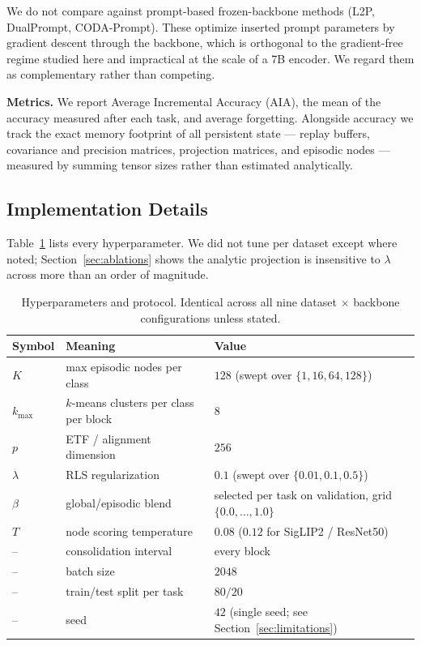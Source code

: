 We do not compare against prompt-based frozen-backbone methods (L2P, DualPrompt, CODA-Prompt). These optimize inserted prompt parameters by gradient descent through the backbone, which is orthogonal to the gradient-free regime studied here and impractical at the scale of a 7B encoder. We regard them as complementary rather than competing.

\textbf{Metrics.} We report Average Incremental Accuracy (AIA), the mean of the accuracy measured after each task, and average forgetting. Alongside accuracy we track the exact memory footprint of all persistent state --- replay buffers, covariance and precision matrices, projection matrices, and episodic nodes --- measured by summing tensor sizes rather than estimated analytically.

\subsection{Implementation Details}
\label{sec:repro}

Table~\ref{tab:hparams} lists every hyperparameter. We did not tune per dataset except where noted; Section~\ref{sec:ablations} shows the analytic projection is insensitive to $\lambda$ across more than an order of magnitude.

\begin{table}[htbp]
\centering
\caption{Hyperparameters and protocol. Identical across all nine dataset $\times$ backbone configurations unless stated.}
\label{tab:hparams}
\begin{tabular}{lll}
\toprule
\textbf{Symbol} & \textbf{Meaning} & \textbf{Value} \\
\midrule
$K$        & max episodic nodes per class      & $128$ (swept over $\{1,16,64,128\}$) \\
$k_{\max}$ & $k$-means clusters per class per block & $8$ \\
$p$        & ETF / alignment dimension          & $256$ \\
$\lambda$  & RLS regularization                 & $0.1$ (swept over $\{0.01,0.1,0.5\}$) \\
$\beta$    & global/episodic blend              & selected per task on validation, grid $\{0.0,\dots,1.0\}$ \\
$T$        & node scoring temperature           & $0.08$ ($0.12$ for SigLIP2 / ResNet50) \\
--         & consolidation interval             & every block \\
--         & batch size                         & $2048$ \\
--         & train/test split per task          & $80/20$ \\
--         & seed                               & $42$ (single seed; see Section~\ref{sec:limitations}) \\
\bottomrule
\end{tabular}
\end{table}

